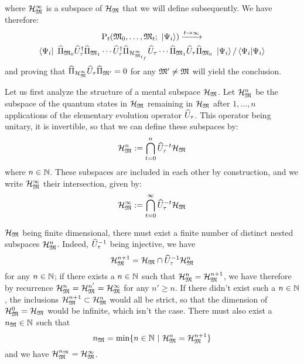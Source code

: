 where $\mathcal H_{\mathfrak{M}}^\infty$ is a subspace of $\mathcal H_{\mathfrak{M}}$ that we will define subsequently. We have therefore:
\begin{multline*}
\mathrm P_t(\mathfrak{M}_0, \dotsc, \mathfrak{M}_t; \ \left|{\Psi_i}\right\rangle) \xrightarrow{t \to \infty} \\
\left\langle{\Psi_i}\right|\  \widehat{\Pi}_{\mathfrak{M}_0} \widehat{U}^{\dagger}_\tau \widehat{\Pi}_{\mathfrak{M}_1} \dotsm \widehat{U}^{\dagger}_\tau \widehat{\Pi}_{\mathcal H_{\mathfrak{M}_{t_f}}^\infty} \widehat{U}_\tau \dotsm \widehat{\Pi}_{\mathfrak{M}_1} \widehat{U}_\tau \widehat{\Pi}_{\mathfrak{M}_0} \ \left|{\Psi_i}\right\rangle / \left\langle{\Psi_i}|{\Psi_i}\right\rangle
\end{multline*}
and proving that $\widehat{\Pi}_{\mathcal H_{\mathfrak{M}}^\infty} \widehat{U}_\tau \widehat{\Pi}_{\mathfrak{M}'} = 0$ for any $\mathfrak{M}' \neq \mathfrak{M}$ will yield the conclusion.

 Let us first analyze the structure of a mental subspace $\mathcal H_{\mathfrak{M}}$. Let $\mathcal H_{\mathfrak{M}}^n$ be the subspace of the quantum states in $\mathcal H_{\mathfrak{M}}$ remaining in $\mathcal H_{\mathfrak{M}}$ after $1, \dotsc, n$ applications of the elementary evolution operator $\widehat{U}_\tau$. This operator being unitary, it is invertible, so that we can define these subspaces by:
\begin{equation*}
\mathcal H_{\mathfrak{M}}^n := \bigcap_{t = 0}^n \widehat{U}_\tau^{-t} \mathcal H_{\mathfrak{M}}
\end{equation*}
where $n \in \mathbb{N}$. These subspaces are included in each other by construction, and we write $\mathcal H_{\mathfrak{M}}^\infty$ their intersection, given by:
\begin{equation*}
\mathcal H_{\mathfrak{M}}^\infty := \bigcap_{t = 0}^\infty \widehat{U}_\tau^{-t} \mathcal H_{\mathfrak{M}}
\end{equation*}

 $\mathcal H_{\mathfrak{M}}$ being finite dimensional, there must exist a finite number of distinct nested subspaces $\mathcal H_{\mathfrak{M}}^n$. Indeed, $\widehat{U}_\tau^{-1}$ being injective, we have
\begin{equation*}
\mathcal H_{\mathfrak{M}}^{n+1} = \mathcal H_{\mathfrak{M}} \cap \widehat{U}_\tau^{-1} \mathcal H_{\mathfrak{M}}^n
\end{equation*}
for any $n \in \mathbb{N}$; if there exists a $n \in \mathbb{N}$ such that $\mathcal H_{\mathfrak{M}}^n = \mathcal H_{\mathfrak{M}}^{n+1}$, we have therefore by recurrence $\mathcal H_{\mathfrak{M}}^n = \mathcal H_{\mathfrak{M}}^{n'} = \mathcal H_{\mathfrak{M}}^\infty$ for any $n' \geq n$. If there didn't exist such a $n \in \mathbb{N}$, the inclusions $\mathcal H_{\mathfrak{M}}^{n+1} \subset \mathcal H_{\mathfrak{M}}^n$ would all be strict, so that the dimension of $\mathcal H_{\mathfrak{M}}^0 = \mathcal H_{\mathfrak{M}}$ would be infinite, which isn't the case. There must also exist a $n_{\mathfrak{M}} \in \mathbb{N}$ such that
\begin{equation*}
n_{\mathfrak{M}} = \min \{ n \in \mathbb{N}\ |\ \mathcal H_{\mathfrak{M}}^n = \mathcal H_{\mathfrak{M}}^{n+1} \}
\end{equation*}
and we have $\mathcal H_{\mathfrak{M}}^{n_{\mathfrak{M}}} = \mathcal H_{\mathfrak{M}}^\infty$.

